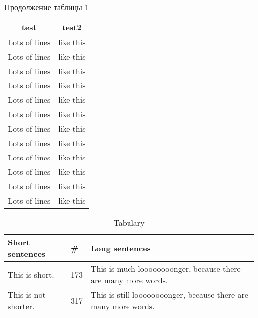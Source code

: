 \begin{longtable}{|l|l|}
    \caption{Длинная таблица}\label{tab:long}\\\hline
    \multicolumn{1}{|c|}{\textbf{test}} & 
    \multicolumn{1}{c|}{\textbf{test2}} \\\hline 
\endfirsthead
    \caption*{Продолжение таблицы \ref{tab:long}}
\endhead
     Lots of lines & like this\\\hline
     Lots of lines & like this\\\hline
     Lots of lines & like this\\\hline
     Lots of lines & like this\\\hline
     Lots of lines & like this\\\hline
     Lots of lines & like this\\\hline
     Lots of lines & like this\\\hline
     Lots of lines & like this\\\hline
     Lots of lines & like this\\\hline
     Lots of lines & like this\\\hline
     Lots of lines & like this\\\hline
     Lots of lines & like this\\\hline
\end{longtable}

\begin{table}[H]
    \caption{Tabulary}\label{tab:y}
  \begin{tabulary}{\textwidth}{|L|L|L|}
  \hline
    Short sentences & \# & Long sentences \\\hline
    This is short. & 173 & This is much loooooooonger, because there are many more words. \\
    \hline
This is not shorter. & 317 & This is still loooooooonger, because there are many more words. \\
\hline
  \end{tabulary}  
\end{table}
